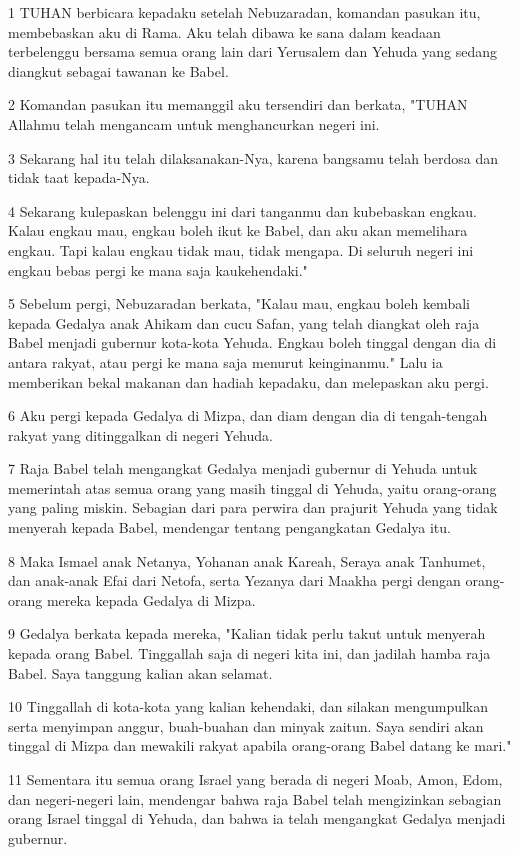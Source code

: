 \par 1 TUHAN berbicara kepadaku setelah Nebuzaradan, komandan pasukan itu, membebaskan aku di Rama. Aku telah dibawa ke sana dalam keadaan terbelenggu bersama semua orang lain dari Yerusalem dan Yehuda yang sedang diangkut sebagai tawanan ke Babel.
\par 2 Komandan pasukan itu memanggil aku tersendiri dan berkata, "TUHAN Allahmu telah mengancam untuk menghancurkan negeri ini.
\par 3 Sekarang hal itu telah dilaksanakan-Nya, karena bangsamu telah berdosa dan tidak taat kepada-Nya.
\par 4 Sekarang kulepaskan belenggu ini dari tanganmu dan kubebaskan engkau. Kalau engkau mau, engkau boleh ikut ke Babel, dan aku akan memelihara engkau. Tapi kalau engkau tidak mau, tidak mengapa. Di seluruh negeri ini engkau bebas pergi ke mana saja kaukehendaki."
\par 5 Sebelum pergi, Nebuzaradan berkata, "Kalau mau, engkau boleh kembali kepada Gedalya anak Ahikam dan cucu Safan, yang telah diangkat oleh raja Babel menjadi gubernur kota-kota Yehuda. Engkau boleh tinggal dengan dia di antara rakyat, atau pergi ke mana saja menurut keinginanmu." Lalu ia memberikan bekal makanan dan hadiah kepadaku, dan melepaskan aku pergi.
\par 6 Aku pergi kepada Gedalya di Mizpa, dan diam dengan dia di tengah-tengah rakyat yang ditinggalkan di negeri Yehuda.
\par 7 Raja Babel telah mengangkat Gedalya menjadi gubernur di Yehuda untuk memerintah atas semua orang yang masih tinggal di Yehuda, yaitu orang-orang yang paling miskin. Sebagian dari para perwira dan prajurit Yehuda yang tidak menyerah kepada Babel, mendengar tentang pengangkatan Gedalya itu.
\par 8 Maka Ismael anak Netanya, Yohanan anak Kareah, Seraya anak Tanhumet, dan anak-anak Efai dari Netofa, serta Yezanya dari Maakha pergi dengan orang-orang mereka kepada Gedalya di Mizpa.
\par 9 Gedalya berkata kepada mereka, "Kalian tidak perlu takut untuk menyerah kepada orang Babel. Tinggallah saja di negeri kita ini, dan jadilah hamba raja Babel. Saya tanggung kalian akan selamat.
\par 10 Tinggallah di kota-kota yang kalian kehendaki, dan silakan mengumpulkan serta menyimpan anggur, buah-buahan dan minyak zaitun. Saya sendiri akan tinggal di Mizpa dan mewakili rakyat apabila orang-orang Babel datang ke mari."
\par 11 Sementara itu semua orang Israel yang berada di negeri Moab, Amon, Edom, dan negeri-negeri lain, mendengar bahwa raja Babel telah mengizinkan sebagian orang Israel tinggal di Yehuda, dan bahwa ia telah mengangkat Gedalya menjadi gubernur.

